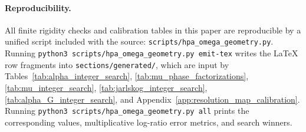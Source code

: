 \paragraph{Reproducibility.}
All finite rigidity checks and calibration tables in this paper are reproducible by a unified script included with the source: \texttt{scripts/hpa\_omega\_geometry.py}. Running \texttt{python3 scripts/hpa\_omega\_geometry.py emit-tex} writes the LaTeX row fragments into \texttt{sections/generated/}, which are input by Tables~\ref{tab:alpha_integer_search}, \ref{tab:mu_phase_factorizations}, \ref{tab:mu_integer_search}, \ref{tab:jarlskog_integer_search}, \ref{tab:alpha_G_integer_search}, and Appendix~\ref{app:resolution_map_calibration}. Running \texttt{python3 scripts/hpa\_omega\_geometry.py all} prints the corresponding values, multiplicative log-ratio error metrics, and search winners.

